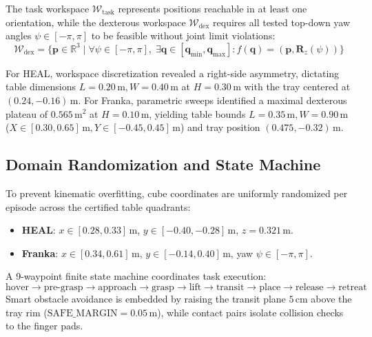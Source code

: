 \documentclass[10pt,twocolumn]{article}
\begin{document}
The task workspace $\mathcal{W}_{\text{task}}$ represents positions reachable in at least one orientation, while the dexterous workspace $\mathcal{W}_{\text{dex}}$ requires all tested top-down yaw angles $\psi \in [-\pi, \pi]$ to be feasible without joint limit violations:
\begin{equation}
    \mathcal{W}_{\text{dex}} = \{\mathbf{p} \in \mathbb{R}^3 \mid \forall \psi \in [-\pi, \pi], \; \exists \mathbf{q} \in [\mathbf{q}_{\min}, \mathbf{q}_{\max}] : f(\mathbf{q}) = (\mathbf{p}, \mathbf{R}_z(\psi))\}
\end{equation}

For HEAL, workspace discretization revealed a right-side asymmetry, dictating table dimensions $L = 0.20\,\text{m}, W = 0.40\,\text{m}$ at $H = 0.30\,\text{m}$ with the tray centered at $(0.24, -0.16)\,\text{m}$. For Franka, parametric sweeps identified a maximal dexterous plateau of $0.565\,\text{m}^2$ at $H = 0.10\,\text{m}$, yielding table bounds $L = 0.35\,\text{m}, W = 0.90\,\text{m}$ ($X \in [0.30, 0.65]\,\text{m}, Y \in [-0.45, 0.45]\,\text{m}$) and tray position $(0.475, -0.32)\,\text{m}$.

\subsection{Domain Randomization and State Machine}
To prevent kinematic overfitting, cube coordinates are uniformly randomized per episode across the certified table quadrants:
\begin{itemize}
    \item \textbf{HEAL}: $x \in [0.28, 0.33]\,\text{m}$, $y \in [-0.40, -0.28]\,\text{m}$, $z = 0.321\,\text{m}$.
    \item \textbf{Franka}: $x \in [0.34, 0.61]\,\text{m}$, $y \in [-0.14, 0.40]\,\text{m}$, yaw $\psi \in [-\pi, \pi]$.
\end{itemize}

A 9-waypoint finite state machine coordinates task execution:
\begin{equation*}
    \text{hover} \rightarrow \text{pre-grasp} \rightarrow \text{approach} \rightarrow \text{grasp} \rightarrow \text{lift} \rightarrow \text{transit} \rightarrow \text{place} \rightarrow \text{release} \rightarrow \text{retreat}
\end{equation*}
Smart obstacle avoidance is embedded by raising the transit plane $5\,\text{cm}$ above the tray rim ($\text{SAFE\_MARGIN} = 0.05\,\text{m}$), while contact pairs isolate collision checks to the finger pads.
\end{document}
